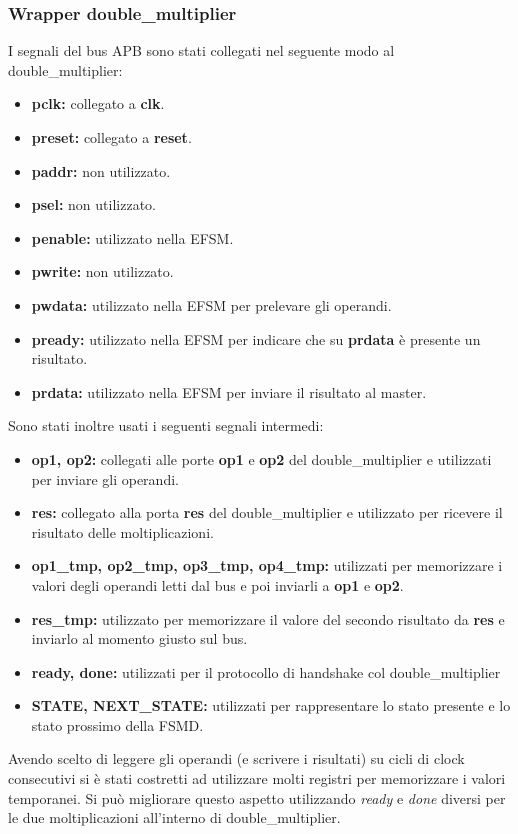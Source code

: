 \documentclass[]{IEEEtran}
\begin{document}
\subsubsection{Wrapper double\_multiplier}
I segnali del bus APB sono stati collegati nel seguente modo al double\_multiplier:
\begin{itemize}
    \item \textbf{pclk:} collegato a \textbf{clk}.
    \item \textbf{preset:} collegato a \textbf{reset}.
    \item \textbf{paddr:} non utilizzato.
    \item \textbf{psel:} non utilizzato.
    \item \textbf{penable:} utilizzato nella EFSM.
    \item \textbf{pwrite:} non utilizzato.
    \item \textbf{pwdata:} utilizzato nella EFSM per prelevare gli operandi.
    \item \textbf{pready:} utilizzato nella EFSM per indicare che su \textbf{prdata} è presente un risultato.
    \item \textbf{prdata:} utilizzato nella EFSM per inviare il risultato al master.
\end{itemize}
Sono stati inoltre usati i seguenti segnali intermedi:
\begin{itemize}
    \item \textbf{op1, op2:} collegati alle porte \textbf{op1} e \textbf{op2} del double\_multiplier e utilizzati per inviare gli operandi.
    \item \textbf{res:} collegato alla porta \textbf{res} del double\_multiplier e utilizzato per ricevere il risultato delle moltiplicazioni.
    \item \textbf{op1\_tmp, op2\_tmp, op3\_tmp, op4\_tmp:} utilizzati per memorizzare i valori degli operandi letti dal bus e poi inviarli a \textbf{op1} e \textbf{op2}.
    \item \textbf{res\_tmp:} utilizzato per memorizzare il valore del secondo risultato da \textbf{res} e inviarlo al momento giusto sul bus.
    \item \textbf{ready, done:} utilizzati per il protocollo di handshake col double\_multiplier
    \item \textbf{STATE, NEXT\_STATE:} utilizzati per rappresentare lo stato presente e lo stato prossimo della FSMD.
\end{itemize}
Avendo scelto di leggere gli operandi (e scrivere i risultati) su cicli di clock consecutivi si è stati costretti ad utilizzare molti registri per memorizzare i valori temporanei. Si può migliorare questo aspetto utilizzando \textit{ready} e \textit{done} diversi per le due moltiplicazioni all'interno di double\_multiplier.
\end{document}
